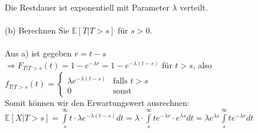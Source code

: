 \documentclass[a4paper]{article}
\begin{document}
Die Restdauer ist exponentiell mit Parameter $\lambda$ verteilt.\\\\
(b) Berechnen Sie $\mathbb{E}[T\vert T >s]$ für $s>0$.\\\\
Aus a) ist gegeben $r = t - s$\\
$\Rightarrow F_{T|T>s}(t) = 1 - e^{-\lambda r} = 1 - e^{-\lambda (t - s)}$ für $t > s$, also\\
\(
f_{T|T>s}(t) = \begin{cases}
    \lambda e^{-\lambda (t - s)} & \text{falls } t > s\\
    0 & \text{sonst}
\end{cases}
\)\\
Somit können wir den Erwartungswert ausrechnen:\\
$\mathbb{E}[X|T>s] = \int\limits_s^\infty t \cdot \lambda e^{-\lambda (t - s)} dt = \lambda \cdot \int\limits_s^\infty te^{-\lambda r} \cdot e^{\lambda s} dt = \lambda e^{\lambda s} \int\limits_s^\infty te^{-\lambda r} dt$
\end{document}
